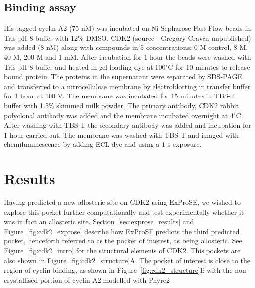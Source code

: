 \subsection{Binding assay}

His-tagged cyclin A2 (75 nM) was incubated on Ni Sepharose Fast Flow beads in Tris pH 8 buffer with 12\% DMSO.
CDK2 (source - Gregory Craven unpublished) was added (8 nM) along with compounds in 5 concentrations: 0 M control, 8 \textmu M, 40 \textmu M, 200 \textmu M and 1 mM.
After incubation for 1 hour the beads were washed with Tris pH 8 buffer and heated in gel-loading dye at 100$^{\circ}$C for 10 minutes to release bound protein.
The proteins in the supernatant were separated by SDS-PAGE and transferred to a nitrocellulose membrane by electroblotting in transfer buffer for 1 hour at 100 V.
The membrane was incubated for 15 minutes in TBS-T buffer with 1.5\% skimmed milk powder.
The primary antibody, CDK2 rabbit polyclonal antibody was added and the membrane incubated overnight at 4$^{\circ}$C.
After washing with TBS-T the secondary antibody was added and incubation for 1 hour carried out.
The membrane was washed with TBS-T and imaged with chemiluminescence by adding ECL dye and using a 1 s exposure.


\section{Results}
\label{sec:cdk2_results}

Having predicted a new allosteric site on CDK2 using ExProSE, we wished to explore this pocket further computationally and test experimentally whether it was in fact an allosteric site.
Section~\ref{sec:exprose_results} and Figure~\ref{fig:cdk2_exprose} describe how ExProSE predicts the third predicted pocket, henceforth referred to as the pocket of interest, as being allosteric.
See Figure~\ref{fig:cdk2_intro} for the structural elements of CDK2.
This pockets are also shown in Figure~\ref{fig:cdk2_structure}A.
The pocket of interest is close to the region of cyclin binding, as shown in Figure~\ref{fig:cdk2_structure}B with the non-crystallised portion of cyclin A2 modelled with Phyre2 \cite{Kelley2015}.

